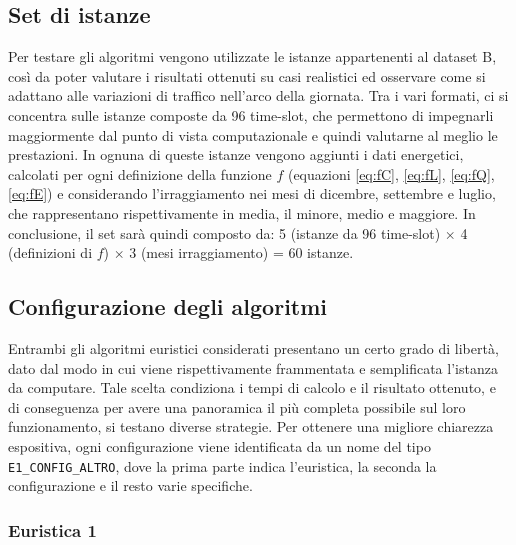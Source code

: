 %
%
\subsection{Set di istanze}

Per testare gli algoritmi vengono utilizzate le istanze appartenenti al dataset B, così da poter valutare i risultati ottenuti su casi realistici ed osservare come si adattano alle variazioni di traffico nell'arco della giornata. Tra i vari formati, ci si concentra sulle istanze composte da 96 time-slot, che permettono di impegnarli maggiormente dal punto di vista computazionale e quindi valutarne al meglio le prestazioni. In ognuna di queste istanze vengono aggiunti i dati energetici, calcolati per ogni definizione della funzione $f$ (equazioni \ref{eq:fC}, \ref{eq:fL}, \ref{eq:fQ}, \ref{eq:fE}) e considerando l'irraggiamento nei mesi di dicembre, settembre e luglio, che rappresentano rispettivamente in media, il minore, medio e maggiore. In conclusione, il set sarà quindi composto da: 5 (istanze da 96 time-slot) $\times$ 4 (definizioni di $f$) $\times$ 3 (mesi irraggiamento) = 60 istanze.


%
%
\subsection{Configurazione degli algoritmi}

Entrambi gli algoritmi euristici considerati presentano un certo grado di libertà, dato dal modo in cui viene rispettivamente frammentata e semplificata l'istanza da computare. Tale scelta condiziona i tempi di calcolo e il risultato ottenuto, e di conseguenza per avere una panoramica il più completa possibile sul loro funzionamento, si testano diverse strategie. Per ottenere una migliore chiarezza espositiva, ogni configurazione viene identificata da un nome del tipo \texttt{E1\_CONFIG\_ALTRO}, dove la prima parte indica l'euristica, la seconda la configurazione e il resto varie specifiche.

\subsubsection{Euristica 1}

